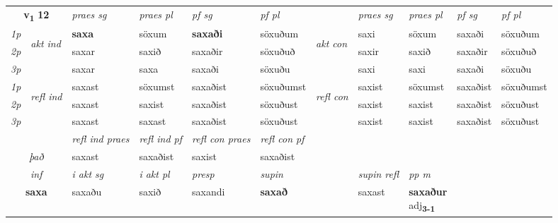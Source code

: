 \noindent
\begin{tabular}{lllllllllll} \toprule
\multicolumn{2}{c}{\textbf{v{\textsubscript{1}}} \Large{\textbf{12}}}  &  \textit{praes sg}  & \textit{praes pl}  &\textit{ pf sg} & \textit{pf pl} &  &  \textit{praes sg}  & \textit{praes pl}  & \textit{pf sg} & \textit{pf pl } \\*
	\cmidrule{3-6} \cmidrule{8-11}
 {\textit{1p}} & \multirow{3}{*}{\begin{turn}{90}\textit{akt ind}\end{turn}} & \textbf{saxa} & söxum & \textbf{saxaði} & söxuðum & \multirow{3}{*}{\begin{turn}{90}\textit{akt con}\end{turn}} &saxi & söxum & saxaði & söxuðum\\*
 {\textit{2p}} &  &  saxar  & saxið & saxaðir & söxuðuð & & saxir & saxið & saxaðir & söxuðuð \\*
{\textit{3p}} &  & saxar & saxa & saxaði & söxuðu & & saxi & saxi& saxaði & söxuðu \\*
\cmidrule{3-6} \cmidrule{8-11}
 {\textit{1p}} & \multirow{3}{*}{\begin{turn}{90}\textit{refl ind}\end{turn}}  & saxast & söxumst & saxaðist & söxuðumst & \multirow{3}{*}{\begin{turn}{90}\textit{refl con}\end{turn}}  &saxist & söxumst & saxaðist & söxuðumst \\*
 {\textit{2p}} &  & saxast & saxist & saxaðist & söxuðust & &saxist & saxist & saxaðist & söxuðust \\*
 {\textit{3p}}  & & saxast & saxast & saxaðist & söxuðust & & saxist & saxist& saxaðist & söxuðust \\*
\cmidrule{3-6} \cmidrule{8-11}

 & & \textit{refl ind praes} & \textit{refl ind pf} & \textit{refl con praes} & \textit{refl con pf} \\*
 \multicolumn{2}{c}{ \textit{það} }& saxast & saxaðist & saxist & saxaðist \\*

\cmidrule{3-9}
   \multicolumn{2}{c}{\textit{inf}}  & \textit{i akt sg} & \textit{i akt pl}   & \textit{presp} & \textit{supin} && \textit{supin refl} & \textit{pp m} \\*
  \multicolumn{2}{c}{\textbf{saxa}} & saxaðu  & saxið   & saxandi &  \textbf{saxað} && saxast & \specialcell{\textbf{saxaður} \\ adj\textbf{\textsubscript{3-1}}} \\*
\end{tabular}

